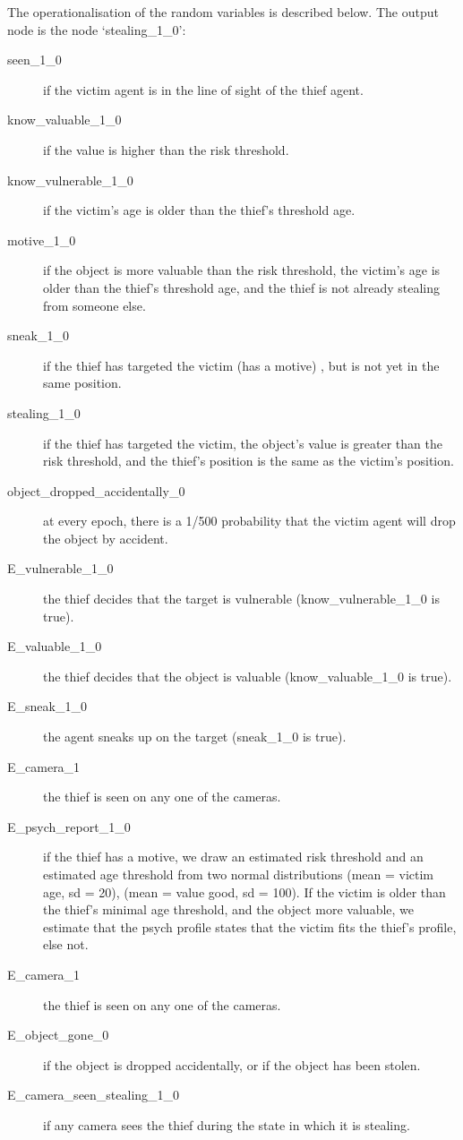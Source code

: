The operationalisation of the random variables is described below. The output node is the node `stealing\_1\_0':
\begin{description}


\item[seen\_1\_0  ] if the victim agent is in the line of sight of the thief agent.
\item[know\_valuable\_1\_0 ] if the value is higher than the risk threshold.
\item[know\_vulnerable\_1\_0  ] if the victim's age is older than the thief's threshold age.
\item[motive\_1\_0 ] if the object is more valuable than the risk threshold, the victim's age is older than the thief's threshold age, and the thief is not already stealing from someone else. 
\item[sneak\_1\_0 ] if the thief has targeted the victim (has a motive) , but is not yet in the same position.
\item[stealing\_1\_0 ] if the thief has targeted the victim, the object's value is greater than the risk threshold, and the thief's position is the same as the victim's position. 
\item[object\_dropped\_accidentally\_0 ] at every epoch, there is a 1/500 probability that the victim agent will drop the object by accident.
\item[E\_vulnerable\_1\_0 ] the thief decides that the target is vulnerable (know\_vulnerable\_1\_0 is true).
\item[E\_valuable\_1\_0 ] the thief decides that the object is valuable (know\_valuable\_1\_0 is true).
\item[E\_sneak\_1\_0 ] the agent sneaks up on the target (sneak\_1\_0 is true).
\item[E\_camera\_1 ] the thief is seen on any one of the cameras.
\item[E\_psych\_report\_1\_0 ] if the thief has a motive, we draw an estimated risk threshold and an estimated age threshold from two normal distributions (mean = victim age, sd = 20), (mean = value good, sd = 100). If the victim is older than the thief's minimal age threshold, and the object more valuable, we estimate that the psych profile states that the victim fits the thief's profile, else not.
\item[E\_camera\_1 ] the thief is seen on any one of the cameras.
\item[E\_object\_gone\_0 ] if the object is dropped accidentally, or if the object has been stolen.
\item[E\_camera\_seen\_stealing\_1\_0 ]  if any camera sees the thief during the state in which it is stealing.
\end{description}

